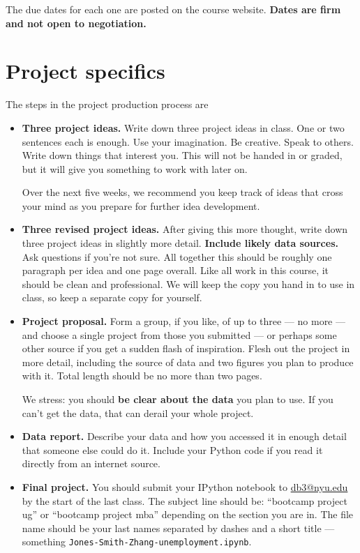 \documentclass[11pt]{article}
\begin{document}
The due dates for each one are posted on the course website.
{\bf Dates are firm and not open to negotiation.}


\section*{Project specifics}

The steps in the project production process are
\begin{itemize}

\item {\bf Three project ideas.}
Write down three project ideas in class.
One or two sentences each is enough.
Use your imagination.  Be creative.  Speak to others.
Write down things that interest you.
This will not be handed in or graded, but it will give you something to work with later on.

Over the next five weeks, we recommend you keep track of ideas that cross
your mind as you prepare for further idea development.


\item {\bf Three revised project ideas.}
After giving this more thought, write down three project ideas in slightly more detail.
{\bf Include likely data sources.}  Ask questions if you're not sure.
All together this should be roughly one paragraph per idea and one page overall.
Like all work in this course, it should be clean and professional.
We will keep the copy you hand in to use in class, so keep a separate copy for yourself.

\item{\bf Project proposal.}
Form a group, if you like, of up to three --- no more ---
and choose a single project from those you submitted ---
or perhaps some other source if you get a sudden flash of inspiration.
Flesh out the project in more detail, including the source of data and
two figures you plan to produce with it.
Total length should be no more than two pages.

We stress:  you should {\bf be clear about the data} you plan to use.
If you can't get the data, that can derail your whole project.

\item {\bf Data report.}
Describe your data and how you accessed it in enough detail that someone else could do it.
Include your Python code if you read it directly from an internet source.


\item {\bf Final project.}
You should submit your IPython notebook to \href{mailto:db3@nyu.edu}{db3@nyu.edu}
by the start of the last class.
The subject line should be:  ``bootcamp project ug'' or ``bootcamp project mba''
depending on the section you are in.
The file name should be your last names separated by dashes and a short title ---
something {\tt Jones-Smith-Zhang-unemployment.ipynb}.


\end{itemize}
\end{document}
